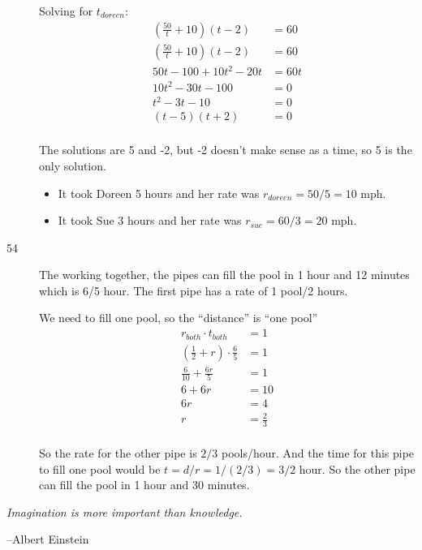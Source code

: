 \documentclass[fleqn,addpoints]{exam}
\begin{document}
\begin{description}
Solving for $t_{doreen}$:
\begin{align*}
  \left( \frac{50}{t} + 10 \right) (t- 2) &= 60 \\
  \left( \frac{50}{t} + 10 \right) (t- 2) &= 60 \\
  50t - 100 + 10t^2 - 20t &= 60t \\
  10t^2 - 30t - 100 &= 0 \\
  t^2 - 3t - 10 &= 0 \\
  (t-5)(t+2) &= 0 \\
\end{align*}

The solutions are 5 and -2, but -2 doesn't make sense as a time, so 5 is the only solution.  

\begin{itemize}
  \item It took Doreen 5 hours and her rate was $r_{doreen} = 50/5 = 10$ mph.  
  \item It took Sue 3 hours and her rate was $r_{sue} = 60/3 = 20$ mph.  
\end{itemize}

\item[54]

The working together, the pipes can fill the pool in 1 hour and 12 minutes which is 6/5 hour.  The first pipe has a rate
of 1 pool/2 hours.

We need to fill one pool, so the ``distance'' is ``one pool'' 
\begin{align*}
  r_{both} \cdot t_{both} &= 1 \\
  \left( \frac{1}{2} + r \right) \cdot \frac{6}{5} &= 1 \\
  \frac{6}{10} + \frac{6r}{5} &= 1 \\
  6 + 6r &= 10 \\
  6r &= 4 \\
  r &= \frac{2}{3} \\
\end{align*}

So the rate for the other pipe is $2/3$ pools/hour.  And the time for this pipe to fill one pool would be 
$t=d/r = 1/(2/3) = 3/2$ hour.  So the other pipe can fill the pool in 1 hour and 30 minutes.

\end{description}

\fi



\vspace{5 in}



{\em Imagination is more important than knowledge.}

\vspace{0.1 cm}
\hspace{0.5 cm} --Albert Einstein
\end{document}
